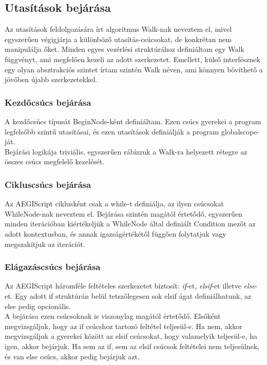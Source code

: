 \documentclass[a4paper,12pt]{report}
\begin{document}

\subsection{Utasítások bejárása}
Az utasítások feldolgozására írt algoritmus Walk-nak neveztem el, mivel egyszerűen végigjárja a különböző utasítás-csúcsokat, de konkrétan nem manipulálja őket. Minden egyes vezérlési struktúrához definiáltam egy Walk függvényt, ami megfelően kezeli az adott szerkezetet. Emellett, külső interfésznek egy olyan absztrakciós szintet írtam szintén Walk néven, ami könnyen bővíthető a jövőben újabb szerkezetekkel.


\subsubsection{Kezdőcsúcs bejárása}
A kezdőcsúcs típusát BeginNode-ként definiáltam. Ezen csúcs gyerekei a program legfelsőbb szintű utasításai, és ezen utasítások definiálják a program globalscope-ját. \\
Bejárási logikája triviális, egyszerűen rábízzuk a Walk-ra helyezett rétegre az összes csúcs megfelelő kezelését.





\subsubsection{Cikluscsúcs bejárása}
Az AEGIScript ciklusként csak a while-t definiálja, az ilyen csúcsokat WhileNode-nak neveztem el. Bejárása szintén magától értetődő, egyszerűen minden iterációban kiértékeljük a WhileNode által definiált Condition mezőt az adott kontextusban, és annak igazságértékétől függően folytatjuk vagy megszakítjuk az iterációt.




\subsubsection{Elágazáscsúcs bejárása}
Az AEGIScript háromféle feltételes szerkezetet biztosít: \textit{if}-et, \textit{elsif}-et illetve \textit{else}-et. Egy adott if struktúrán belül tetszőlegesen sok elsif ágat definiálhatunk, az else pedig opcionális. \\
A bejárása ezen csúcsoknak is viszonylag magától értetődő. Elsőként megvizsgáljuk, hogy az if csúcshoz tartozó feltétel teljesül-e. Ha nem, akkor megvizsgáljuk a gyerekei között az elsif csúcsokat, hogy valamelyik teljesül-e, ha igen, akkor bejárjuk. Ha sem az if, sem az elsif csúcsok feltételei nem teljesülnek, és van else csúcs, akkor pedig bejárjuk azt.

\end{document}
